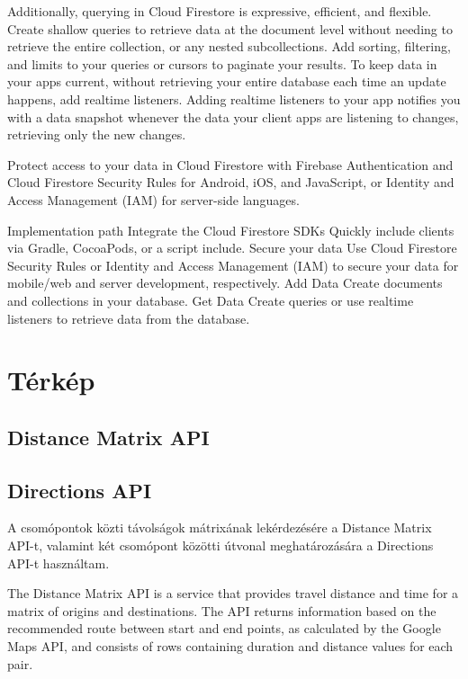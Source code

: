 Additionally, querying in Cloud Firestore is expressive, efficient, and flexible. Create shallow queries to retrieve data at the document level without needing to retrieve the entire collection, or any nested subcollections. Add sorting, filtering, and limits to your queries or cursors to paginate your results. To keep data in your apps current, without retrieving your entire database each time an update happens, add realtime listeners. Adding realtime listeners to your app notifies you with a data snapshot whenever the data your client apps are listening to changes, retrieving only the new changes.

Protect access to your data in Cloud Firestore with Firebase Authentication and Cloud Firestore Security Rules for Android, iOS, and JavaScript, or Identity and Access Management (IAM) for server-side languages.

Implementation path
Integrate the Cloud Firestore SDKs	Quickly include clients via Gradle, CocoaPods, or a script include.
Secure your data	Use Cloud Firestore Security Rules or Identity and Access Management (IAM) to secure your data for mobile/web and server development, respectively.
Add Data	Create documents and collections in your database.
Get Data	Create queries or use realtime listeners to retrieve data from the database.

\section{Térkép}\label{sec:ALAP:szerkeszt}

\subsection{Distance Matrix API}

\subsection{Directions API}

A csomópontok közti távolságok mátrixának lekérdezésére a Distance Matrix API-t, valamint két csomópont közötti útvonal meghatározására a Directions API-t használtam.

The Distance Matrix API is a service that provides travel distance and time for a matrix of origins and destinations. The API returns information based on the recommended route between start and end points, as calculated by the Google Maps API, and consists of rows containing duration and distance values for each pair.


